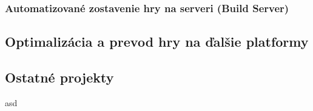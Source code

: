 \documentclass[slovak,bachelorpractice,dept460,male,csharp,cpdeclaration]{diploma}
\begin{document}
\subsubsection{Automatizované zostavenie hry na serveri (Build Server)}
\label{sec:BuildServer}
\subsection{Optimalizácia a prevod hry na ďalšie platformy}
\label{sec:Port}
\subsection{Ostatné projekty}
\label{sec:Others}
asd



\printbibliography[title={Literatúra}, heading=bibintoc]
\end{document}

